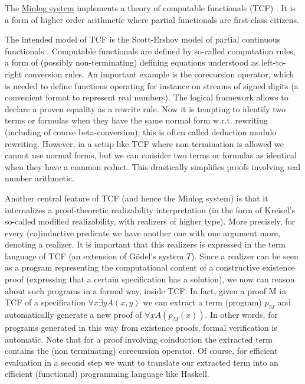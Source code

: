 

The \href{http://minlog-system.de}{Minlog system} implements a theory of
computable functionals (TCF) \cite{SchwichtenbergWainer12}.
It is a form of higher order arithmetic where partial functionals are
first-class citizens.

The intended model of TCF is the Scott-Ershov model of partial
continuous functionals \cite{Ershov77}. Computable functionals are defined
by so-called computation rules, a form of (possibly non-terminating)
defining equations understood as left-to-right conversion rules.  An
important example is the corecursion operator, which is needed to
define functions operating for instance on streams of signed digits (a
convenient format to represent real numbers).  The logical framework
allows to declare a proven equality as a rewrite rule.  Now it is
tempting to identify two terms or formulas when they have the same
normal form w.r.t. rewriting (including of course beta-conversion);
this is often called deduction modulo rewriting.  However, in a setup
like TCF where non-termination is allowed we cannot use normal forms,
but we can consider two terms or formulas as identical when they have
a common reduct.  This drastically simplifies proofs involving real
number arithmetic.

Another central feature of TCF (and hence the Minlog system) is that
it internalizes a proof-theoretic realizability interpretation (in the
form of Kreisel's so-called modified realizability, with realizers of
higher type).  More precisely, for every (co)inductive predicate we
have another one with one argument more, denoting a realizer.  It is
important that this realizers is expressed in the term language of TCF
(an extension of G\"odel's system $T$).  Since a realizer can be seen as
a program representing the computational content of a constructive
existence proof (expressing that a certain specification has a
solution), we now can reason about such programs in a formal way,
inside TCF.  In fact, given a proof M in TCF of a specification
$\forall x\exists y A(x,y)$ we can extract a term (program) $p_M$ and automatically
generate a new proof of $\forall x A(p_M(x))$.  In other words, for
programs generated in this way from existence proofs, formal
verification is automatic.  Note that for a proof involving
coinduction the extracted term contains the (non terminating)
corecursion operator.  Of course, for efficient evaluation in a second
step we want to translate our extracted term into an efficient
(functional) programming language like Haskell.


